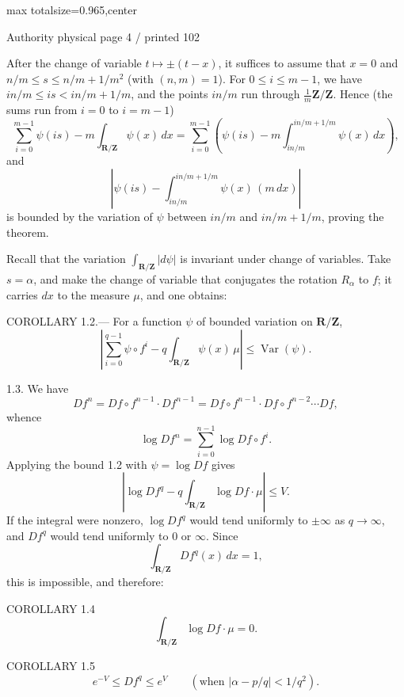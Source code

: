 \documentclass{article}
\begin{document}
\newpage
\noindent\begin{adjustbox}{max totalsize={\textwidth}{0.965\textheight},center}\begin{minipage}{\textwidth}
\noindent\hfill\scriptsize Authority physical page 4 / printed 102\par\normalsize
After the change of variable \(t\longmapsto\pm(t-x)\), it suffices to assume that \(x=0\) and \(n/m\leq s\leq n/m+1/m^2\) (with \((n,m)=1\)). For \(0\leq i\leq m-1\), we have \(in/m\leq is<in/m+1/m\), and the points \(in/m\) run through \(\frac1m\mathbf Z/\mathbf Z\). Hence (the sums run from \(i=0\) to \(i=m-1\))
\[
\sum_{i=0}^{m-1}\psi(is)-m\int_{\mathbf R/\mathbf Z}\psi(x)\,dx
=\sum_{i=0}^{m-1}\left(\psi(is)-m\int_{in/m}^{in/m+1/m}\psi(x)\,dx\right),
\]
and
\[
\left|\psi(is)-\int_{in/m}^{in/m+1/m}\psi(x)\,(m\,dx)\right|
\]
is bounded by the variation of \(\psi\) between \(in/m\) and \(in/m+1/m\), proving the theorem.

Recall that the variation \(\int_{\mathbf R/\mathbf Z}|d\psi|\) is invariant under change of variables. Take \(s=\alpha\), and make the change of variable that conjugates the rotation \(R_\alpha\) to \(f\); it carries \(dx\) to the measure \(\mu\), and one obtains:

COROLLARY 1.2.— For a function \(\psi\) of bounded variation on \(\mathbf R/\mathbf Z\),
\[
\left|\sum_{i=0}^{q-1}\psi\circ f^i-q\int_{\mathbf R/\mathbf Z}\psi(x)\,\mu\right|\leq\operatorname{Var}(\psi).
\]

1.3. We have
\[
Df^n=Df\circ f^{n-1}\cdot Df^{n-1}
=Df\circ f^{n-1}\cdot Df\circ f^{n-2}\cdots Df,
\]
whence
\[
\tag{1.3.1}\log Df^n=\sum_{i=0}^{n-1}\log Df\circ f^i.
\]
Applying the bound 1.2 with \(\psi=\log Df\) gives
\[
\left|\log Df^q-q\int_{\mathbf R/\mathbf Z}\log Df\cdot\mu\right|\leq V.
\]
If the integral were nonzero, \(\log Df^q\) would tend uniformly to \(\pm\infty\) as \(q\to\infty\), and \(Df^q\) would tend uniformly to \(0\) or \(\infty\). Since
\[
\int_{\mathbf R/\mathbf Z}Df^q(x)\,dx=1,
\]
this is impossible, and therefore:

COROLLARY 1.4
\[
\int_{\mathbf R/\mathbf Z}\log Df\cdot\mu=0.
\]

COROLLARY 1.5
\[
e^{-V}\leq Df^q\leq e^V\qquad\left(\text{when }|\alpha-p/q|<1/q^2\right).
\]
\end{minipage}\end{adjustbox}
\end{document}
